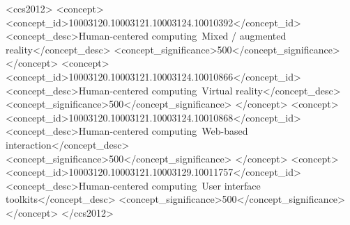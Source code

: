 \documentclass[sigconf]{acmart}
\begin{document}
%
%
\begin{CCSXML}
<ccs2012>
<concept>
<concept_id>10003120.10003121.10003124.10010392</concept_id>
<concept_desc>Human-centered computing~Mixed / augmented reality</concept_desc>
<concept_significance>500</concept_significance>
</concept>
<concept>
<concept_id>10003120.10003121.10003124.10010866</concept_id>
<concept_desc>Human-centered computing~Virtual reality</concept_desc>
<concept_significance>500</concept_significance>
</concept>
<concept>
<concept_id>10003120.10003121.10003124.10010868</concept_id>
<concept_desc>Human-centered computing~Web-based interaction</concept_desc>
<concept_significance>500</concept_significance>
</concept>
<concept>
<concept_id>10003120.10003121.10003129.10011757</concept_id>
<concept_desc>Human-centered computing~User interface toolkits</concept_desc>
<concept_significance>500</concept_significance>
</concept>
</ccs2012>
\end{CCSXML}


%
\end{document}
